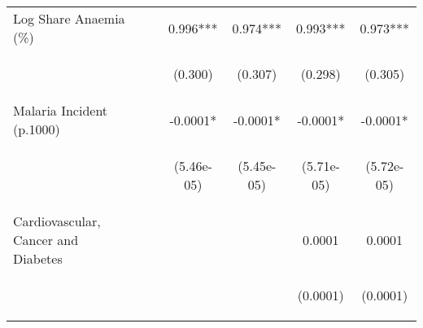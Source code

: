 \documentclass{article}
\begin{document}
\begin{table}[htbp]
{\begin{tabular}{lcccccc}
Log Share Anaemia (\%)&  &  & 0.996*** & 0.974*** & 0.993*** & 0.973*** \\
\vspace{4pt} & \begin{footnotesize}\end{footnotesize} & \begin{footnotesize}\end{footnotesize} & \begin{footnotesize}(0.300)\end{footnotesize} & \begin{footnotesize}(0.307)\end{footnotesize} & \begin{footnotesize}(0.298)\end{footnotesize} & \begin{footnotesize}(0.305)\end{footnotesize} \\
Malaria Incident (p.1000) &  &  & -0.0001* & -0.0001* & -0.0001* & -0.0001* \\
\vspace{4pt} & \begin{footnotesize}\end{footnotesize} & \begin{footnotesize}\end{footnotesize} & \begin{footnotesize}(5.46e-05)\end{footnotesize} & \begin{footnotesize}(5.45e-05)\end{footnotesize} & \begin{footnotesize}(5.71e-05)\end{footnotesize} & \begin{footnotesize}(5.72e-05)\end{footnotesize} \\
Cardiovascular, Cancer and Diabetes &  &  &  &  & 0.0001 & 0.0001 \\
\vspace{4pt} & \begin{footnotesize}\end{footnotesize} & \begin{footnotesize}\end{footnotesize} & \begin{footnotesize}\end{footnotesize} & \begin{footnotesize}\end{footnotesize} & \begin{footnotesize}(0.0001)\end{footnotesize} & \begin{footnotesize}(0.0001)\end{footnotesize} \\

\end{tabular}}
\end{table}
\end{document}
